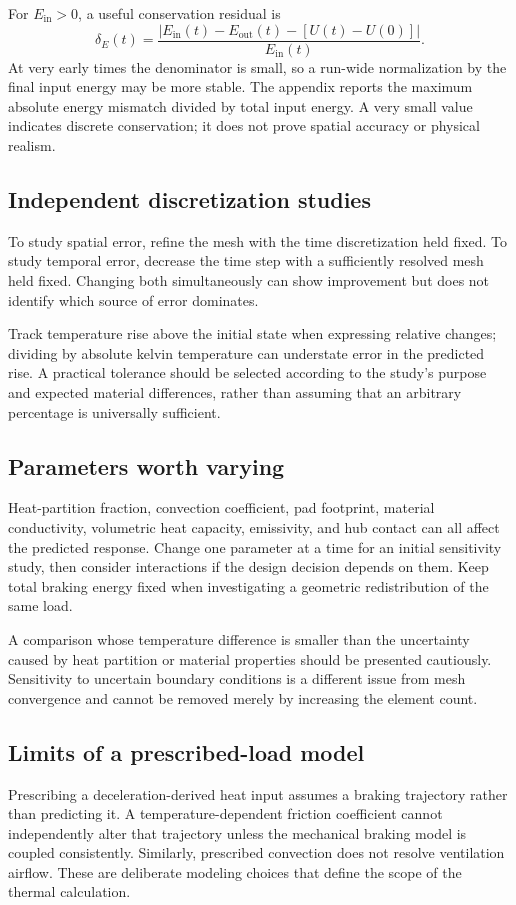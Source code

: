 \documentclass[11pt,a4paper]{article}
\begin{document}
For $E_{\mathrm{in}}>0$, a useful conservation residual is
\begin{equation}
\delta_E(t)=\frac{|E_{\mathrm{in}}(t)-E_{\mathrm{out}}(t)-[U(t)-U(0)]|}
{E_{\mathrm{in}}(t)}.
\end{equation}
At very early times the denominator is small, so a run-wide normalization by the final input energy may be more stable. The appendix reports the maximum absolute energy mismatch divided by total input energy. A very small value indicates discrete conservation; it does not prove spatial accuracy or physical realism.

\subsection{Independent discretization studies}
To study spatial error, refine the mesh with the time discretization held fixed. To study temporal error, decrease the time step with a sufficiently resolved mesh held fixed. Changing both simultaneously can show improvement but does not identify which source of error dominates.

Track temperature rise above the initial state when expressing relative changes; dividing by absolute kelvin temperature can understate error in the predicted rise. A practical tolerance should be selected according to the study's purpose and expected material differences, rather than assuming that an arbitrary percentage is universally sufficient.

\subsection{Parameters worth varying}
Heat-partition fraction, convection coefficient, pad footprint, material conductivity, volumetric heat capacity, emissivity, and hub contact can all affect the predicted response. Change one parameter at a time for an initial sensitivity study, then consider interactions if the design decision depends on them. Keep total braking energy fixed when investigating a geometric redistribution of the same load.

A comparison whose temperature difference is smaller than the uncertainty caused by heat partition or material properties should be presented cautiously. Sensitivity to uncertain boundary conditions is a different issue from mesh convergence and cannot be removed merely by increasing the element count.

\subsection{Limits of a prescribed-load model}
Prescribing a deceleration-derived heat input assumes a braking trajectory rather than predicting it. A temperature-dependent friction coefficient cannot independently alter that trajectory unless the mechanical braking model is coupled consistently. Similarly, prescribed convection does not resolve ventilation airflow. These are deliberate modeling choices that define the scope of the thermal calculation.
\end{document}
